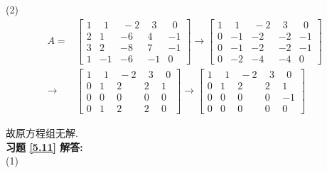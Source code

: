 \documentclass[a4paper]{book}
\begin{document}
(2)
\begin{displaymath}
\begin{aligned}
A=&\begin{bmatrix} 1&\ \ 1&\ -2&\ \ 3&\ \ 0\\2&1&-6&4&-1\\3&2&-8&7&-1\\1&-1&-6&-1&0 \end{bmatrix}\rightarrow
\begin{bmatrix}1&\ \ 1&\ -2&\ \ 3&\ \ 0\\0&-1&-2&-2&-1\\0&-1&-2&-2&-1\\0&-2&-4&-4&0  \end{bmatrix}\\ \rightarrow &
\begin{bmatrix}1&\ \ 1&\ -2&\ \ 3&\ \ 0\\0&1&2&2&1\\0&0&0&0&0\\0&1&2&2&0  \end{bmatrix}\rightarrow
\begin{bmatrix} 1&\ \ 1&\ -2&\ \ 3&\ \ 0\\0&1&2&2&1\\0&0&0&0&-1\\0&0&0&0&0 \end{bmatrix}
\end{aligned} \end{displaymath}

故原方程组无解.\\	
\textbf{习题 \ref{5.11} 解答:}\\
(1)
\end{document}
